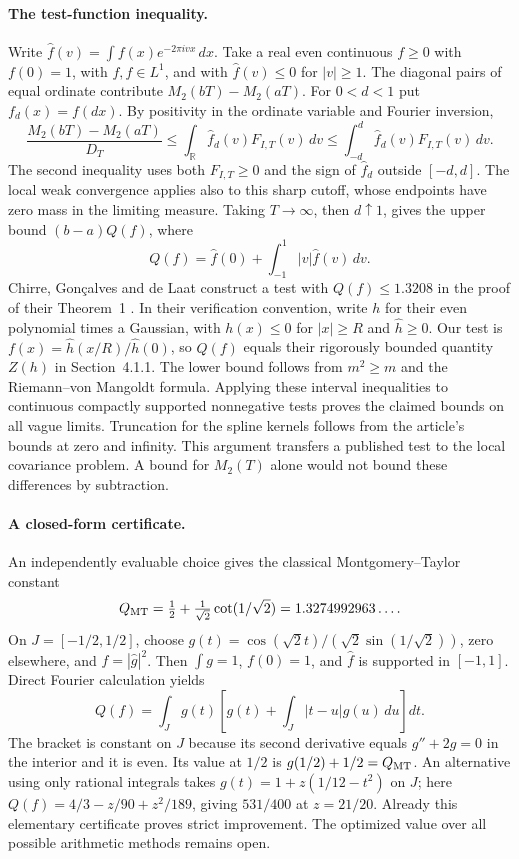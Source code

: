 \documentclass[11pt]{article}
\begin{document}
\paragraph{The test-function inequality.}
Write $\widehat f(v)=\int f(x)e^{-2\pi ivx}\,dx$. Take a real even continuous $f\ge0$ with $f(0)=1$, with $f,\widehat f\in L^1$, and with $\widehat f(v)\le0$ for $|v|\ge1$. The diagonal pairs of equal ordinate contribute $M_2(bT)-M_2(aT)$. For $0<d<1$ put $f_d(x)=f(dx)$. By positivity in the ordinate variable and Fourier inversion,
\[
 \frac{M_2(bT)-M_2(aT)}{D_T}
 \le \int_{\mathbb R}\widehat f_d(v)F_{I,T}(v)\,dv
 \le \int_{-d}^d\widehat f_d(v)F_{I,T}(v)\,dv.
\]
The second inequality uses both $F_{I,T}\ge0$ and the sign of $\widehat f_d$ outside $[-d,d]$. The local weak convergence applies also to this sharp cutoff, whose endpoints have zero mass in the limiting measure. Taking $T\to\infty$, then $d\uparrow1$, gives the upper bound $(b-a)Q(f)$, where
\[
 Q(f)=\widehat f(0)+\int_{-1}^1 |v|\widehat f(v)\,dv .
\]
Chirre, Gon\c calves and de Laat construct a test with $Q(f)\le1.3208$ in the proof of their Theorem~1 \cite{ChirreLP}. In their verification convention, write $h$ for their even polynomial times a Gaussian, with $h(x)\le0$ for $|x|\ge R$ and $\widehat h\ge0$. Our test is $f(x)=\widehat h(x/R)/\widehat h(0)$, so $Q(f)$ equals their rigorously bounded quantity $Z(h)$ in Section~4.1.1. The lower bound follows from $m^2\ge m$ and the Riemann--von Mangoldt formula. Applying these interval inequalities to continuous compactly supported nonnegative tests proves the claimed bounds on all vague limits. Truncation for the spline kernels follows from the article's bounds at zero and infinity. This argument transfers a published test to the local covariance problem. A bound for $M_2(T)$ alone would not bound these differences by subtraction.

\paragraph{A closed-form certificate.}
An independently evaluable choice gives the classical Montgomery--Taylor constant
\[
 Q_{\rm MT}=\tfrac12+\tfrac1{\sqrt2}\cot(1/\sqrt2)=1.3274992963\ldots .
\]
On $J=[-1/2,1/2]$, choose $g(t)=\cos(\sqrt2 t)/(\sqrt2\sin(1/\sqrt2))$, zero elsewhere, and $f=|\widehat g|^2$. Then $\int g=1$, $f(0)=1$, and $\widehat f$ is supported in $[-1,1]$. Direct Fourier calculation yields
\[
 Q(f)=\int_Jg(t)\left[g(t)+\int_J |t-u|g(u)\,du\right]dt.
\]
The bracket is constant on $J$ because its second derivative equals $g''+2g=0$ in the interior and it is even. Its value at $1/2$ is $g(1/2)+1/2=Q_{\rm MT}$. An alternative using only rational integrals takes $g(t)=1+z(1/12-t^2)$ on $J$; here $Q(f)=4/3-z/90+z^2/189$, giving $531/400$ at $z=21/20$. Already this elementary certificate proves strict improvement. The optimized value over all possible arithmetic methods remains open.
\end{document}
